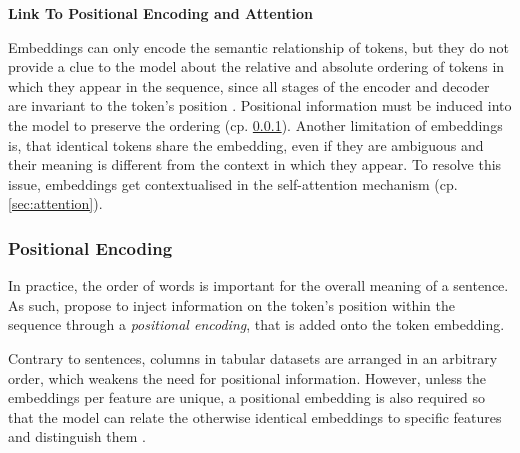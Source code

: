 \textbf{Link To Positional Encoding and Attention}

Embeddings can only encode the semantic relationship of tokens, but they do not provide a clue to the model about the relative and absolute ordering of tokens in which they appear in the sequence, since all stages of the encoder and decoder are invariant to the token's position \autocite[][3744]{leeSetTransformerFramework2019}. Positional information must be induced into the model to preserve the ordering (cp. \cref{sec:positional-encoding}). Another limitation of embeddings is, that identical tokens share the embedding, even if they are ambiguous and their meaning is different from the context in which they appear. To resolve this issue, embeddings get contextualised in the self-attention mechanism (cp. \cref{sec:attention}).

\subsubsection{Positional Encoding}\label{sec:positional-encoding}

In practice, the order of words is important for the overall meaning of a sentence. As such, \textcite[][6]{vaswaniAttentionAllYou2017} propose to inject information on the \gls{token}'s position within the sequence through a \emph{positional encoding}, that is added onto the \gls{token} embedding.

Contrary to sentences, columns in tabular datasets are arranged in an arbitrary order, which weakens the need for positional information. However, unless the embeddings per feature are unique, a positional embedding is also required so that the model can relate the otherwise identical embeddings to specific features and distinguish them \autocites[][3]{huangTabTransformerTabularData2020}[][15]{somepalliSaintImprovedNeural2021}.

